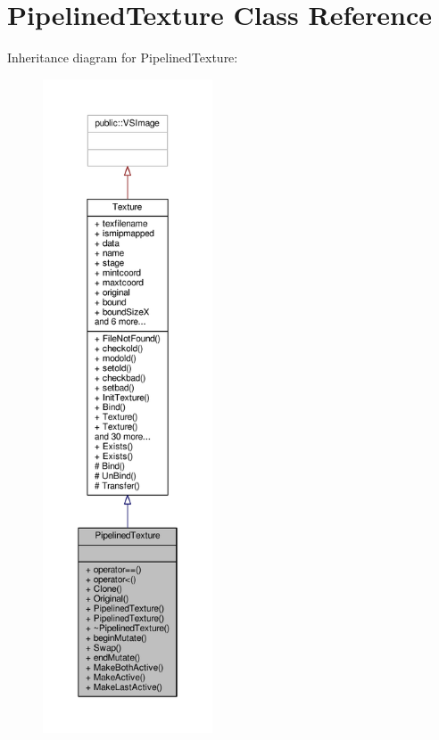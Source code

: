 \hypertarget{classPipelinedTexture}{}\section{Pipelined\+Texture Class Reference}
\label{classPipelinedTexture}


Inheritance diagram for Pipelined\+Texture\+:
\nopagebreak
\begin{figure}[H]
\begin{center}
\leavevmode
\includegraphics[height=550pt]{d1/d95/classPipelinedTexture__inherit__graph}
\end{center}
\end{figure}


